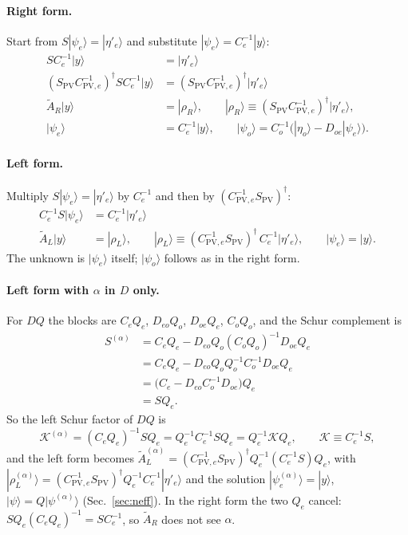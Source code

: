 \documentclass[11pt,a4paper]{article}
\numberwithin{equation}{section}
\newcommand{\dg}{^{\dagger}}
\newcommand{\Spv}{S_{\mathrm{PV}}}
\newcommand{\AR}{\tilde A_{R}}
\newcommand{\AL}{\tilde A_{L}}
\newcommand{\Ce}{C_{e}}
\newcommand{\Co}{C_{o}}
\newcommand{\Cpve}{C_{\mathrm{PV},e}}
\begin{document}
\paragraph{Right form.} Start from $S|\psi_e\rangle=|\eta'_e\rangle$ and substitute
$|\psi_e\rangle=\Ce^{-1}|y\rangle$:
\begin{align}
S\Ce^{-1}|y\rangle&=|\eta'_e\rangle\nonumber\\
(\Spv\Cpve^{-1})\dg S\Ce^{-1}|y\rangle&=(\Spv\Cpve^{-1})\dg|\eta'_e\rangle\nonumber\\
\AR|y\rangle&=|\rho_R\rangle,\qquad |\rho_R\rangle\equiv(\Spv\Cpve^{-1})\dg|\eta'_e\rangle,\nonumber\\
|\psi_e\rangle&=\Ce^{-1}|y\rangle,\qquad |\psi_o\rangle=\Co^{-1}\big(|\eta_o\rangle-D_{oe}|\psi_e\rangle\big).
\end{align}

\paragraph{Left form.} Multiply $S|\psi_e\rangle=|\eta'_e\rangle$ by $\Ce^{-1}$ and then by
$(\Cpve^{-1}\Spv)\dg$:
\begin{align}
\Ce^{-1}S|\psi_e\rangle&=\Ce^{-1}|\eta'_e\rangle\nonumber\\
\AL|y\rangle&=|\rho_L\rangle,\qquad |\rho_L\rangle\equiv(\Cpve^{-1}\Spv)\dg\,\Ce^{-1}|\eta'_e\rangle,\qquad |\psi_e\rangle=|y\rangle .
\end{align}
The unknown is $|\psi_e\rangle$ itself; $|\psi_o\rangle$ follows as in the right form.

\paragraph{Left form with $\alpha$ in $D$ only.} For $DQ$ the blocks are $\Ce Q_e$, $D_{eo}Q_o$,
$D_{oe}Q_e$, $\Co Q_o$, and the Schur complement is
\begin{align}
S^{(\alpha)}&=\Ce Q_e-D_{eo}Q_o(\Co Q_o)^{-1}D_{oe}Q_e\nonumber\\
&=\Ce Q_e-D_{eo}Q_oQ_o^{-1}\Co^{-1}D_{oe}Q_e\nonumber\\
&=\big(\Ce-D_{eo}\Co^{-1}D_{oe}\big)Q_e\nonumber\\
&=SQ_e .
\end{align}
So the left Schur factor of $DQ$ is
\begin{equation}
\mathcal K^{(\alpha)}=(\Ce Q_e)^{-1}SQ_e=Q_e^{-1}\Ce^{-1}SQ_e=Q_e^{-1}\mathcal KQ_e,\qquad \mathcal K\equiv\Ce^{-1}S,
\label{eq:Ksim}
\end{equation}
and the left form becomes $\AL^{(\alpha)}=(\Cpve^{-1}\Spv)\dg Q_e^{-1}(\Ce^{-1}S)Q_e$, with
$|\rho_L^{(\alpha)}\rangle=(\Cpve^{-1}\Spv)\dg Q_e^{-1}\Ce^{-1}|\eta'_e\rangle$ and the solution
$|\psi^{(\alpha)}_e\rangle=|y\rangle$, $|\psi\rangle=Q|\psi^{(\alpha)}\rangle$ (Sec.~\ref{sec:neff}). In the right
form the two $Q_e$ cancel: $SQ_e(\Ce Q_e)^{-1}=S\Ce^{-1}$, so $\AR$ does not see $\alpha$.
\end{document}
